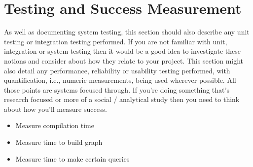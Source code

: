 
\chapter{Testing and Success Measurement}

As well as documenting system testing, this section should also
describe any unit testing or integration testing performed. If you are not familiar with unit, integration or
system testing then it would be a good idea to investigate these notions and consider about how they
relate to your project. This section might also detail any performance, reliability or usability testing
performed, with quantification, i.e., numeric measurements, being used wherever possible. All those points
are systems focused through. If you’re doing something that’s research focused or more of a social /
analytical study then you need to think about how you’ll measure success.

\begin{itemize}
\item Measure compilation time 
\item Measure time to build graph 
\item Measure time to make certain queries 
\end{itemize}
